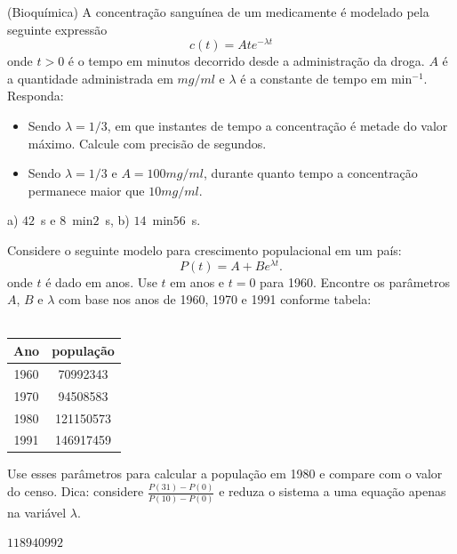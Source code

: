 


\begin{exer} (Bioquímica) A concentração sanguínea de um medicamente é modelado pela seguinte expressão
\begin{equation} c(t)=Ate^{-\lambda t} \end{equation}
onde $t>0$ é o tempo em minutos decorrido desde a administração da droga. $A$ é a quantidade administrada em $mg/ml$ e $\lambda$ é a constante de tempo em min$^{-1}$.
Responda:
\begin{itemize}
\item[a)] Sendo $\lambda=1/3$, em que instantes de tempo a concentração é metade do valor máximo. Calcule com precisão de segundos.
\item[b)] Sendo $\lambda=1/3$ e $A=100mg/ml$, durante quanto tempo a concentração permanece maior que $10mg/ml$.
\end{itemize}
\end{exer}

\begin{resp}

a) $42$~s e $8$~min$2$~s, b) $14$~min$56$~s.

\end{resp}


\begin{exer}\label{pop} Considere o seguinte modelo para crescimento populacional em um país:
\begin{equation} P(t)=A+Be^{\lambda t}. \end{equation}
onde $t$ é dado em anos. Use $t$ em anos e $t=0$ para 1960. Encontre os parâmetros $A$, $B$ e $\lambda$ com base nos anos de 1960, 1970 e 1991 conforme tabela:\\~

\begin{tabular}{|c|c|}
\hline
Ano & população\\
\hline
1960&70992343\\
1970&94508583\\
1980&121150573\\
1991&146917459\\
\hline
\end{tabular}

Use esses parâmetros para calcular a população em 1980 e compare com o valor do censo. Dica: considere $\frac{P(31)-P(0)}{P(10)-P(0)}$ e reduza o sistema a uma equação apenas na variável $\lambda$.
\end{exer}
\begin{resp}

$118940992$

\end{resp}

